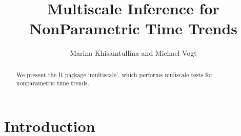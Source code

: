 \documentclass[a4paper]{scrartcl}
\title{Multiscale Inference for NonParametric Time Trends}
\author{Marina Khisamtullina and Michael Vogt}
\begin{document}


%

\maketitle

\begin{abstract}
We present the R package `multiscale', which performs muliscale tests for nonparametric time trends.
\end{abstract}

\section{Introduction}
\end{document}
